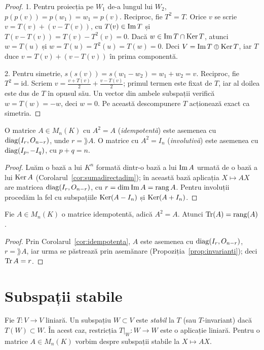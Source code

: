 \begin{proof}
1. Pentru proiecția pe $W_1$ de-a lungul lui $W_2$, $p(p(v))=p(w_1)=w_1=p(v)$. Reciproc, fie $T^2=T$. Orice $v$ se scrie $v=T(v)+(v-T(v))$, cu $T(v)\in\operatorname{Im} T$ și $T(v-T(v))=T(v)-T^2(v)=0$. Dacă $w\in\operatorname{Im} T\cap\operatorname{Ker} T$, atunci $w=T(u)$ și $w=T(u)=T^2(u)=T(w)=0$. Deci $V=\operatorname{Im} T\oplus\operatorname{Ker} T$, iar $T$ duce $v=T(v)+(v-T(v))$ în prima componentă.

2. Pentru simetrie, $s(s(v))=s(w_1-w_2)=w_1+w_2=v$. Reciproc, fie $T^2=\mathrm{id}$. Scriem $v=\frac{v+T(v)}2+\frac{v-T(v)}2$; primul termen este fixat de $T$, iar al doilea este dus de $T$ în opusul său. Un vector din ambele subspații verifică $w=T(w)=-w$, deci $w=0$. Pe această descompunere $T$ acționează exact ca simetria.
\end{proof}

\begin{corolar}\label{cor:idempotenta}
O matrice $A\in M_n(K)$ cu $A^2=A$ (\emph{idempotentă}) este asemenea cu $\operatorname{diag}(I_r,O_{n-r})$, unde $r=\rang A$. O matrice cu $A^2=I_n$ (\emph{involutivă}) este asemenea cu $\operatorname{diag}(I_p,-I_q)$, cu $p+q=n$.
\end{corolar}

\begin{proof}
Luăm o bază a lui $K^n$ formată dintr-o bază a lui $\operatorname{Im} A$ urmată de o bază a lui $\operatorname{Ker} A$ (Corolarul~\ref{cor:sumadirectadim}); în această bază aplicația $X\mapsto AX$ are matricea $\operatorname{diag}(I_r,O_{n-r})$, cu $r=\dim\operatorname{Im} A=\operatorname{rang} A$. Pentru involuții procedăm la fel cu subspațiile $\operatorname{Ker}(A-I_n)$ și $\operatorname{Ker}(A+I_n)$.
\end{proof}

\begin{lema}\label{lema:idemptrrang}
Fie $A\in M_n(K)$ o matrice idempotentă, adică $A^2=A$. Atunci $\operatorname{Tr}(A)=\operatorname{rang}(A)$.
\end{lema}

\begin{proof}
Prin Corolarul~\ref{cor:idempotenta}, $A$ este asemenea cu $\operatorname{diag}(I_r,O_{n-r})$, $r=\rang A$, iar urma se păstrează prin asemănare (Propoziția~\ref{prop:invarianti}); deci $\operatorname{Tr} A=r$.
\end{proof}

\section{Subspații stabile}

\begin{definitie}
Fie $T:V\to V$ liniară. Un subspațiu $W\subset V$ este \emph{stabil} la $T$ (sau $T$-invariant) dacă $T(W)\subset W$. În acest caz, restricția $T|_W:W\to W$ este o aplicație liniară. Pentru o matrice $A\in M_n(K)$ vorbim despre subspații stabile la $X\mapsto AX$.
\end{definitie}

